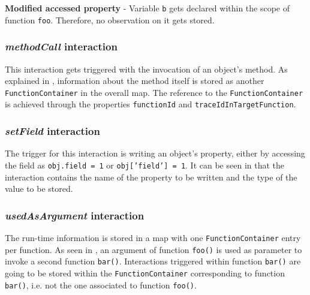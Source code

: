 \begin{code}
  \caption[Modified accessed property]{\textbf{Modified accessed property} - Variable \texttt{b} gets declared within the scope of function \texttt{foo}. Therefore, no observation on it gets stored.}
  \label{code:get-field-changing-at-runtime}
\end{code}



\subsubsection{\textit{methodCall} interaction}
This interaction gets triggered with the invocation of an object's method. As explained in , information about the method itself is stored as another \texttt{FunctionContainer} in the overall map. The reference to the \texttt{FunctionContainer} is achieved through the properties \texttt{functionId} and \texttt{traceIdInTargetFunction}.



\subsubsection{\textit{setField} interaction}
The trigger for this interaction is writing an object's property, either by accessing the field as \texttt{obj.field = 1} or \texttt{obj['field'] = 1}. It can be seen in  that the interaction contains the name of the property to be written and the type of the value to be stored.




\subsubsection{\textit{usedAsArgument} interaction}
The run-time information is stored in a map with one \texttt{FunctionContainer} entry per function. As seen in , an argument of function \texttt{foo()} is used as parameter to invoke a second function \texttt{bar()}. Interactions triggered within function \texttt{bar()} are going to be stored within the \texttt{FunctionContainer} corresponding to function \texttt{bar()}, i.e. not the one associated to function \texttt{foo()}.

